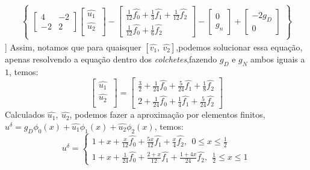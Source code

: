\begin{align}
[\hat{v_1}\ \hat{v_2}]\begin{Bmatrix}
\begin{bmatrix}
4 & -2 \\ 
-2 & 2
\end{bmatrix}
\begin{bmatrix}
\hat{u_1}\ \\ \hat{u_2}\\ 
\end{bmatrix}
-
\begin{bmatrix}
\frac{1}{12}\hat{f_0} + \frac{1}{3}\hat{f_1} + \frac{1}{12}\hat{f_2} \\ 
\frac{1}{12}\hat{f_0} + \frac{1}{6}\hat{f_2}
\end{bmatrix}-
\begin{bmatrix}
0\\ 
g_n
\end{bmatrix}+
\begin{bmatrix}
-2g_D\\ 
0
\end{bmatrix}
\end{Bmatrix}
\end{align}]
 Assim, notamos que para quaisquer $[\hat{v_1},\ \hat{v_2}]$,podemos solucionar essa equação, apenas resolvendo a equação dentro dos \emph{colchetes},fazendo $g_D$ e $g_N$ ambos iguais a $1$, temos:
\begin{equation}
 \begin{bmatrix}
\hat{u_1}\ \\ \hat{u_2}\\ 
\end{bmatrix}
= \begin{bmatrix}\frac{3}{2} +\frac{1}{24}\hat{f_0}+\frac{5}{24}\hat{f_1}+\frac{1}{8}\hat{f_2} \\ 2 +\frac{1}{24}\hat{f_0}+\frac{1}{4}\hat{f_1}+\frac{5}{24}\hat{f_2} \end{bmatrix}
\end{equation}
 Calculados $\hat{u_1},\ \hat{u_2}$, podemos fazer a aproximação por elementos finitos, $u^\delta =g_D\phi_0(x) + \hat{u_1}\phi_1(x) +\hat{u_2}\phi_2(x)$, temos:
\begin{equation}
u^\delta =
\begin{cases}
1 + x +\frac{x}{12}\hat{f_0} + \frac{5x}{12}\hat{f_1} +\frac{x} {4}\hat{f_2},\ \ 0 \leq x \leq \frac{1}{2}\\
1 + x +\frac{1}{24}\hat{f_0} + \frac{2+x}{12}\hat{f_1} +\frac{1+4x}{24}\hat{f_2},\ \ \frac{1}{2} \leq x \leq 1
\end{cases}
\end{equation}
